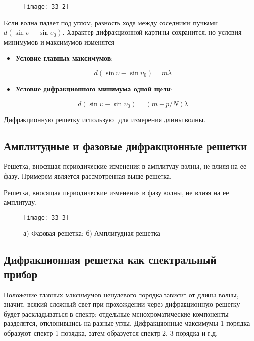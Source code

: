 \begin{figure}[H]
	\centering
	\texttt{[image: 33\_2]}
\end{figure}

Если волна падает под углом, разность хода между соседними пучками $d(\sin{\upsilon} - \sin{\upsilon_0})$. Характер дифракционной картины сохранится, но условия минимумов и максимумов изменятся:

\begin{itemize}
	\item \textbf{Условие главных максимумов}:
	
	\begin{equation*}
		d(\sin{\upsilon}-\sin{\upsilon_0})=m\lambda
	\end{equation*}
	
	\item \textbf{Условие дифракционного минимума одной щели}:
	
	\begin{equation*}
		d(\sin{\upsilon}-\sin{\upsilon_0})=(m+p/N)\lambda
	\end{equation*}
\end{itemize}

Дифракционную решетку используют для измерения длины волны.

\subsection{Амплитудные и фазовые дифракционные решетки}

 Решетка, вносящая периодические изменения в амплитуду волны, не влияя на ее фазу.
Примером является рассмотренная выше решетка.

 Решетка, вносящая  периодические изменения в фазу волны, не влияя на ее амплитуду.

\begin{figure}[H]
	\centering
	\texttt{[image: 33\_3]}
	\caption{а) Фазовая решетка; б) Амплитудная решетка}
\end{figure} 

\subsection{Дифракционная решетка как спектральный прибор}
Положение главных максимумов ненулевого порядка зависит от длины волны, значит, всякий сложный свет при прохождении через дифракционную решетку будет раскладываться в спектр:  отдельные монохроматические компоненты разделятся, отклонившись на разные углы. Дифракционные максимумы 1 порядка образуют спектр 1 порядка, затем образуется спектр 2, 3 порядка и т.д.

